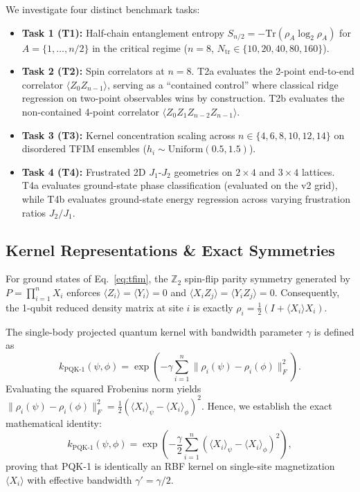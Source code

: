 \documentclass[conference]{IEEEtran}
\begin{document}
We investigate four distinct benchmark tasks:
\begin{itemize}
    \item \textbf{Task 1 (T1):} Half-chain entanglement entropy $S_{n/2} = -\text{Tr}(\rho_{A} \log_2 \rho_{A})$ for $A=\{1,\dots,n/2\}$ in the critical regime ($n=8$, $N_{\text{tr}} \in \{10, 20, 40, 80, 160\}$).
    \item \textbf{Task 2 (T2):} Spin correlators at $n=8$. T2a evaluates the 2-point end-to-end correlator $\langle Z_0 Z_{n-1} \rangle$, serving as a ``contained control'' where classical ridge regression on two-point observables wins by construction. T2b evaluates the non-contained 4-point correlator $\langle Z_0 Z_1 Z_{n-2} Z_{n-1} \rangle$.
    \item \textbf{Task 3 (T3):} Kernel concentration scaling across $n \in \{4, 6, 8, 10, 12, 14\}$ on disordered TFIM ensembles ($h_i \sim \text{Uniform}(0.5, 1.5)$).
    \item \textbf{Task 4 (T4):} Frustrated 2D $J_1$-$J_2$ geometries on $2 \times 4$ and $3 \times 4$ lattices. T4a evaluates ground-state phase classification (evaluated on the v2 grid), while T4b evaluates ground-state energy regression across varying frustration ratios $J_2/J_1$.
\end{itemize}

\subsection{Kernel Representations \& Exact Symmetries}
For ground states of Eq.~\eqref{eq:tfim}, the $\mathbb{Z}_2$ spin-flip parity symmetry generated by $P = \prod_{i=1}^n X_i$ enforces $\langle Z_i \rangle = \langle Y_i \rangle = 0$ and $\langle X_i Z_j \rangle = \langle Y_i Z_j \rangle = 0$. Consequently, the 1-qubit reduced density matrix at site $i$ is exactly $\rho_i = \frac{1}{2}(I + \langle X_i \rangle X_i)$.

The single-body projected quantum kernel with bandwidth parameter $\gamma$ is defined as
\begin{equation}
k_{\text{PQK-1}}(\psi, \phi) = \exp\left( -\gamma \sum_{i=1}^n \|\rho_i(\psi) - \rho_i(\phi)\|_F^2 \right).
\end{equation}
Evaluating the squared Frobenius norm yields $\|\rho_i(\psi) - \rho_i(\phi)\|_F^2 = \frac{1}{2}(\langle X_i \rangle_\psi - \langle X_i \rangle_\phi)^2$. Hence, we establish the exact mathematical identity:
\begin{equation}
k_{\text{PQK-1}}(\psi, \phi) = \exp\left( -\frac{\gamma}{2} \sum_{i=1}^n (\langle X_i \rangle_\psi - \langle X_i \rangle_\phi)^2 \right),
\end{equation}
proving that PQK-1 is identically an RBF kernel on single-site magnetization $\langle X_i \rangle$ with effective bandwidth $\gamma' = \gamma/2$.
\end{document}
